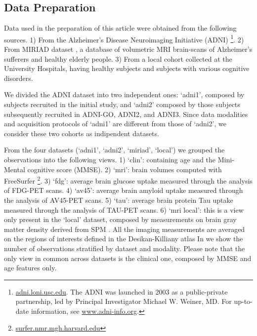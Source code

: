 % 

\subsection{Data Preparation}
Data used in the preparation of this article were obtained from the following sources.
1) From the Alzheimer's Disease Neuroimaging Initiative (ADNI)
\footnote{
\href{http://adni.loni.usc.edu}{adni.loni.usc.edu}. The ADNI was launched in 2003 as a public-private partnership, led by Principal Investigator Michael W. Weiner, MD. For up-to-date information, see \href{www.adni-info.org}{www.adni-info.org}.
}.
2) From MIRIAD dataset \cite{Miriad}, a database of volumetric MRI brain-scans of Alzheimer's sufferers and healthy elderly people.
3) From a local cohort collected at the University Hospitals, having healthy subjects and subjects with various cognitive disorders.

We divided the ADNI dataset into two independent ones:
`adni1', composed by subjects recruited in the initial study,
and `adni2' composed by those subjects subsequently recruited in ADNI-GO, ADNI2, and ADNI3.
Since data modalities and acquisition protocols of `adni1' are different from those of `adni2', we consider these two cohorts as indipendent datasets.

From the four datasets (`adni1', `adni2', `miriad', `local') we grouped the observations into the following views.
1) `clin': containing age and the Mini-Mental cognitive score (MMSE).
2) `mri': brain volumes computed with FreeSurfer \footnote{
\href{https://surfer.nmr.mgh.harvard.edu/}{surfer.nmr.mgh.harvard.edu}
}.
3) `fdg': average brain glucose uptake measured through the analysis of FDG-PET scans.
4) `av45': average brain amyloid uptake measured through the analysis of AV45-PET scans.
5) `tau': average brain protein Tau uptake measured through the analysis of TAU-PET scans.
6) `mri local': this is a view only present in the `local' dataset, composed by measurements on brain gray matter density derived from SPM \cite{Ashburner2000}.
All the imaging measurements are averaged on the regions of interests defined in the Desikan-Killiany atlas \cite{Desikan2006}
In  we show the number of observations stratified by dataset and modality.
Please note that the only view in common across datasets is the clinical one, composed by MMSE and age features only.

